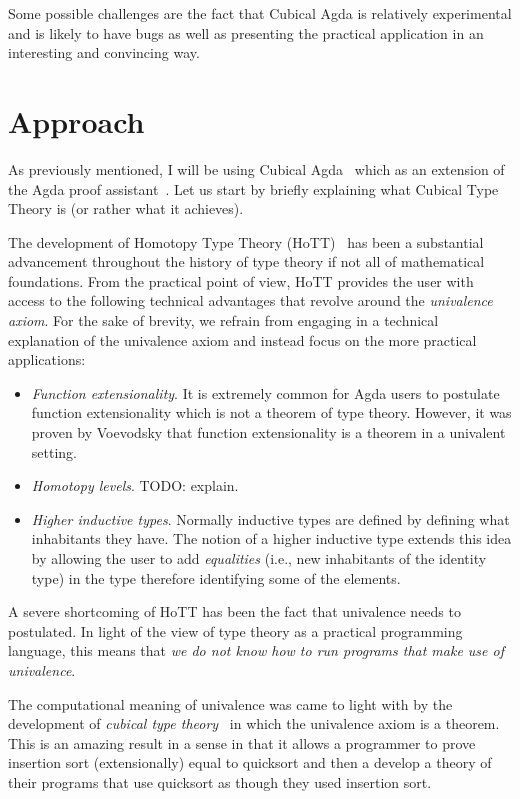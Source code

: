 \documentclass{article}
\begin{document}
Some possible challenges are the fact that Cubical Agda is relatively experimental and is
likely to have bugs as well as presenting the practical application in an interesting and
convincing way.

\section{Approach}

As previously mentioned, I will be using Cubical Agda~\cite{cubicalagda} which as an
extension of the Agda proof assistant~\cite{norell:2008}. Let us start by briefly
explaining what Cubical Type Theory is (or rather what it achieves).

The development of Homotopy Type Theory (HoTT)~\cite{hottbook} has been a substantial
advancement throughout the history of type theory if not all of mathematical foundations.
From the practical point of view, HoTT provides the user with access to the following
technical advantages that revolve around the \emph{univalence axiom}. For the sake of
brevity, we refrain from engaging in a technical explanation of the univalence axiom and
instead focus on the more practical applications:

\begin{itemize}
  \item \emph{Function extensionality}. It is extremely common for Agda users to postulate
    function extensionality which is not a theorem of type theory. However, it was proven
    by Voevodsky that function extensionality is a theorem in a univalent setting.
  \item \emph{Homotopy levels}. TODO: explain.
  \item \emph{Higher inductive types}. Normally inductive types are defined by defining
    what inhabitants they have. The notion of a higher inductive type extends this idea by
    allowing the user to add \emph{equalities} (i.e., new inhabitants of the identity
    type) in the type therefore identifying some of the elements.
\end{itemize}

A severe shortcoming of HoTT has been the fact that univalence needs to postulated. In
light of the view of type theory as a practical programming language, this means that
\emph{we do not know how to run programs that make use of univalence}.

The computational meaning of univalence was came to light with by the development of
\emph{cubical type theory}~\cite{cubicaltt} in which the univalence axiom is a theorem.
This is an amazing result in a sense in that it allows a programmer to prove insertion
sort (extensionally) equal to quicksort and then a develop a theory of their programs that
use quicksort as though they used insertion sort.



\end{document}
